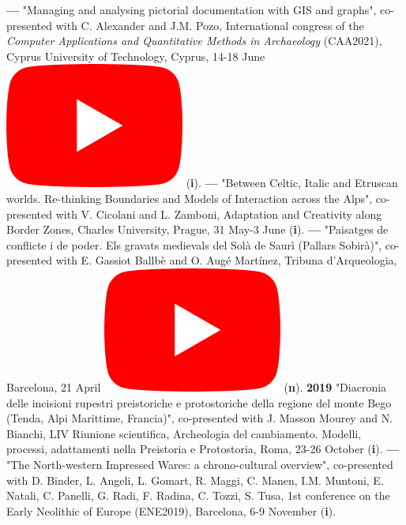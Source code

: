 \documentclass{article}
\begin{document}
\smallbreak
\textbf{--- }"Managing and analysing pictorial documentation with GIS and graphs", co-presented with C. Alexander and J.M. Pozo, International congress of the \textit{Computer Applications and Quantitative Methods in Archaeology} (CAA2021), Cyprus University of Technology, Cyprus, 14-18 June \href{https://youtu.be/tUhHhzGSgbk?t=4950}{\includegraphics[scale=0.2]{icon_youtube}} (\textbf{i}).
\smallbreak
\textbf{--- }"Between Celtic, Italic and Etruscan worlds. Re-thinking Boundaries and Models of Interaction across the Alps", co-presented with V. Cicolani and L. Zamboni, Adaptation and Creativity along Border Zones, Charles University, Prague, 31 May-3 June (\textbf{i}).
\smallbreak
\textbf{--- }"Paisatges de conflicte i de poder. Els gravats medievals del Sol\`{a} de Saur\`{i} (Pallars Sobir\`{a})", co-presented with E. Gassiot Ballb\`{e} and O. Aug\'{e} Mart\'{i}nez, Tribuna d'Arqueologia, Barcelona, 21 April \href{https://www.youtube.com/watch?v=4b7gLw4NV_E}{\includegraphics[scale=0.2]{icon_youtube}} (\textbf{n}).
\smallbreak
\textbf{2019 }"Diacronia delle incisioni rupestri preistoriche e protostoriche della regione del monte Bego (Tenda, Alpi Marittime, Francia)", co-presented with J. Masson Mourey and N. Bianchi, LIV Riunione scientifica, Archeologia del cambiamento. Modelli, processi, adattamenti nella Preistoria e Protostoria, Roma, 23-26 October (\textbf{i}).
\smallbreak
\textbf{--- }"The North-western Impressed Wares: a chrono-cultural overview", co-presented with D. Binder, L. Angeli, L. Gomart, R. Maggi, C. Manen, I.M. Muntoni, E. Natali, C. Panelli, G. Radi, F. Radina, C. Tozzi, S. Tusa, 1st conference on the Early Neolithic of Europe (ENE2019), Barcelona, 6-9 November (\textbf{i}).
\end{document}
